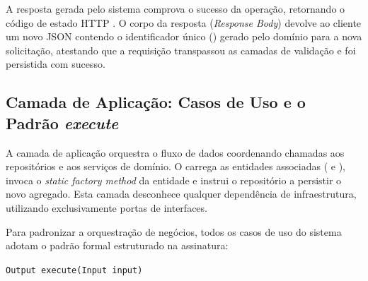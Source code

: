 A resposta gerada pelo sistema comprova o sucesso da operação, retornando o código de estado HTTP . O corpo da resposta (\textit{Response Body}) devolve ao cliente um novo JSON contendo o identificador único () gerado pelo domínio para a nova solicitação, atestando que a requisição transpassou as camadas de validação e foi persistida com sucesso.

\subsection{Camada de Aplicação: Casos de Uso e o Padrão \textit{execute}}

A camada de aplicação orquestra o fluxo de dados coordenando chamadas aos repositórios e aos serviços de domínio. O  carrega as entidades associadas ( e ), invoca o \textit{static factory method} da entidade e instrui o repositório a persistir o novo agregado. Esta camada desconhece qualquer dependência de infraestrutura, utilizando exclusivamente portas de interfaces.

Para padronizar a orquestração de negócios, todos os casos de uso do sistema adotam o padrão formal estruturado na assinatura:

\begin{center}
  \texttt{Output execute(Input input)}
\end{center}

